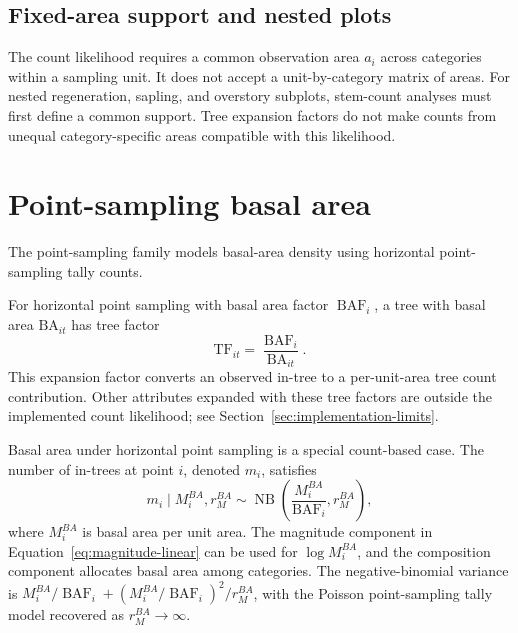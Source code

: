\documentclass[11pt]{article}
\newcommand{\NB}{\operatorname{NB}}
\begin{document}
\subsection{Fixed-area support and nested plots}

The count likelihood requires a common observation area \(a_i\) across
categories within a sampling unit. It does not accept a unit-by-category
matrix of areas. For nested regeneration, sapling, and overstory subplots,
stem-count analyses must first define a common support. Tree expansion
factors do not make counts from unequal category-specific areas compatible
with this likelihood.

\section{Point-sampling basal area}
\label{sec:point-sampling}

The point-sampling family models basal-area density using horizontal
point-sampling tally counts.

For horizontal point sampling with basal area factor
\(\operatorname{BAF}_i\), a tree with basal area \(\mathrm{BA}_{it}\) has tree factor
\begin{equation}
  \mathrm{TF}_{it} = \frac{\operatorname{BAF}_i}{\mathrm{BA}_{it}}.
  \label{eq:point-tree-factor}
\end{equation}
This expansion factor converts an observed in-tree to a per-unit-area tree
count contribution. Other attributes expanded with these tree factors are outside the
implemented count likelihood; see Section~\ref{sec:implementation-limits}.

Basal area under horizontal point sampling is a special count-based case. The
number of in-trees at point \(i\), denoted \(m_i\), satisfies
\begin{equation}
  m_i\mid M_i^{BA},r_M^{BA}
  \sim
  \NB\left(\frac{M_i^{BA}}{\operatorname{BAF}_i},r_M^{BA}\right),
  \label{eq:point-ba-count}
\end{equation}
where \(M_i^{BA}\) is basal area per unit area. The magnitude component in
Equation~\ref{eq:magnitude-linear} can be used for \(\log M_i^{BA}\), and the
composition component allocates basal area among categories. The
negative-binomial variance is
\(M_i^{BA}/\operatorname{BAF}_i + (M_i^{BA}/\operatorname{BAF}_i)^2/r_M^{BA}\), with the
Poisson point-sampling tally model recovered as \(r_M^{BA}\rightarrow\infty\).
\end{document}
